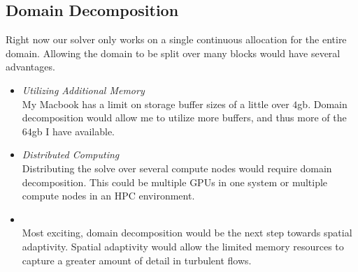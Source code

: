 \subsection{Domain Decomposition}
Right now our solver only works on a single continuous allocation
for the entire domain.
Allowing the domain to be split over many blocks would have several 
advantages.
\begin{itemize}
\item \textit{Utilizing Additional Memory } \\
My Macbook has a limit on storage buffer sizes of a little over $4$gb.
Domain decomposition would allow me to utilize more buffers, and thus more of the $64$gb I have available.

\item \textit{Distributed Computing} \\
Distributing the solve over several compute nodes would require 
domain decomposition. 
This could be multiple GPUs in one system or
multiple compute nodes in an HPC environment.

\item {} \\
Most exciting, domain decomposition would be 
the next step towards spatial adaptivity. 
Spatial adaptivity would allow the limited memory resources to
capture a greater amount of detail in turbulent flows.
\end{itemize}

